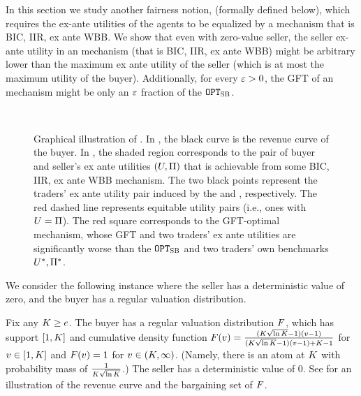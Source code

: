 

In this section we study another fairness notion, {\equitability} (formally defined below), which requires the ex-ante utilities of the agents to be equalized by a mechanism that is BIC, IIR, ex ante WBB. We show that even with zero-value seller, the seller ex-ante utility in an {\equitable} mechanism (that is BIC, IIR, ex ante WBB) might be arbitrary lower than the maximum ex ante utility of the seller (which is at most the maximum utility of the buyer). Additionally, for every $\varepsilon > 0$, the GFT of an {\equitable} mechanism might be only an $\varepsilon$ fraction of the {\SecondBest} $\texttt{OPT}_{\textsc{SB}}$.


\begin{figure}
    \centering
    \subfloat[]{

\label{fig:equitable:revenue curve}
}~~~~
    \subfloat[]{

\label{fig:equitable:ex ante utility pair}
}
\caption{Graphical illustration of . In , the black curve is the revenue curve of the buyer. In , the shaded region corresponds to the pair of buyer and seller's ex ante utilities $(U,\Pi)$ that is achievable from some BIC, IIR, ex ante WBB mechanism. The two black points represent the traders' ex ante utility pair induced by the {\BuyerOffer} and {\SellerOffer}, respectively. The red dashed line represents equitable utility pairs (i.e., ones with $U = \Pi$). The red square corresponds to the GFT-optimal {\equitable} mechanism, whose GFT and two traders' ex ante utilities are significantly worse than the {\SecondBest} $\texttt{OPT}_{\textsc{SB}}$ and two traders' own benchmarks $U^*,\Pi^*$.}
    \label{fig:equitable}
\end{figure}


We consider the following instance where the seller has a deterministic value of zero, and the buyer has a regular valuation distribution.
\begin{example}
    \label{example:equitable}
    Fix any $K \geq e$. The buyer has a regular valuation distribution $F$, which has support $[1, K]$ and cumulative density function $F(v) = \frac{(K\sqrt{\ln K} - 1)(v - 1)}{(K\sqrt{\ln K} - 1)(v - 1) + K - 1}$ for $v \in[1,K]$
    and $F(v) = 1$ for $v \in(K, \infty)$.
    (Namely, there is an atom at $K$ with probability mass of $\frac{1}{K\sqrt{\ln K}}$.)
    The seller has a deterministic value of 0.
    See  for an illustration of the revenue
curve and the bargaining set of $F$.
\end{example}

